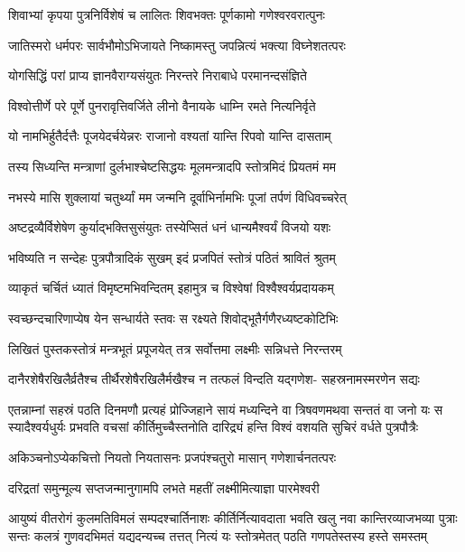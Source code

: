 \twolineshloka
{शिवाभ्यां कृपया पुत्रनिर्विशेषं च लालितः}
{शिवभक्तः पूर्णकामो गणेश्वरवरात्पुनः}

\twolineshloka
{जातिस्मरो धर्मपरः सार्वभौमोऽभिजायते}
{निष्कामस्तु जपन्नित्यं भक्त्या विघ्नेशतत्परः}

\twolineshloka
{योगसिद्धिं परां प्राप्य ज्ञानवैराग्यसंयुतः}
{निरन्तरे निराबाधे परमानन्दसंज्ञिते}

\twolineshloka
{विश्वोत्तीर्णे परे पूर्णे पुनरावृत्तिवर्जिते}
{लीनो वैनायके धाम्नि रमते नित्यनिर्वृते}

\twolineshloka
{यो नामभिर्हुतैर्दत्तैः पूजयेदर्चयेन्नरः}
{राजानो वश्यतां यान्ति रिपवो यान्ति दासताम्}

\twolineshloka
{तस्य सिध्यन्ति मन्त्राणां दुर्लभाश्चेष्टसिद्धयः}
{मूलमन्त्रादपि स्तोत्रमिदं प्रियतमं मम}

\twolineshloka
{नभस्ये मासि शुक्लायां चतुर्थ्यां मम जन्मनि}
{दूर्वाभिर्नामभिः पूजां तर्पणं विधिवच्चरेत्}

\twolineshloka
{अष्टद्रव्यैर्विशेषेण कुर्याद्भक्तिसुसंयुतः}
{तस्येप्सितं धनं धान्यमैश्वर्यं विजयो यशः}

\twolineshloka
{भविष्यति न सन्देहः पुत्रपौत्रादिकं सुखम्}
{इदं प्रजपितं स्तोत्रं पठितं श्रावितं श्रुतम्}

\twolineshloka
{व्याकृतं चर्चितं ध्यातं विमृष्टमभिवन्दितम्}
{इहामुत्र च विश्वेषां विश्वैश्वर्यप्रदायकम्}

\twolineshloka
{स्वच्छन्दचारिणाप्येष येन सन्धार्यते स्तवः}
{स रक्ष्यते शिवोद्भूतैर्गणैरध्यष्टकोटिभिः}

\twolineshloka
{लिखितं पुस्तकस्तोत्रं मन्त्रभूतं प्रपूजयेत्}
{तत्र सर्वोत्तमा लक्ष्मीः सन्निधत्ते निरन्तरम्}

\fourlineindentedshloka
{दानैरशेषैरखिलैर्व्रतैश्च}
{तीर्थैरशेषैरखिलैर्मखैश्च}
{न तत्फलं विन्दति यद्गणेश-}
{सहस्रनामस्मरणेन सद्यः}

\fourlineindentedshloka
{एतन्नाम्नां सहस्रं पठति दिनमणौ प्रत्यहं प्रोज्जिहाने}
{सायं मध्यन्दिने वा त्रिषवणमथवा सन्ततं वा जनो यः}
{स स्यादैश्वर्यधुर्यः प्रभवति वचसां कीर्तिमुच्चैस्तनोति}
{दारिद्र्यं हन्ति विश्वं वशयति सुचिरं वर्धते पुत्रपौत्रैः}

\twolineshloka
{अकिञ्चनोऽप्येकचित्तो नियतो नियतासनः}
{प्रजपंश्चतुरो मासान् गणेशार्चनतत्परः}

\twolineshloka
{दरिद्रतां समुन्मूल्य सप्तजन्मानुगामपि}
{लभते महतीं लक्ष्मीमित्याज्ञा पारमेश्वरी}

\fourlineindentedshloka
{आयुष्यं वीतरोगं कुलमतिविमलं सम्पदश्चार्तिनाशः}
{कीर्तिर्नित्यावदाता भवति खलु नवा कान्तिरव्याजभव्या}
{पुत्राः सन्तः कलत्रं गुणवदभिमतं यद्यदन्यच्च तत्तत्}
{नित्यं यः स्तोत्रमेतत् पठति गणपतेस्तस्य हस्ते समस्तम्}

